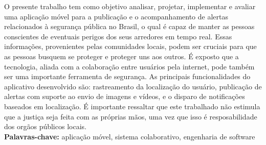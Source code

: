 \documentclass[
	12pt,				%
	openright,			%
	oneside,			%
	a4paper,			%
	english,			%
	french,				%
	spanish,			%
	brazil,				%
	]{lib/abntex2}
\begin{document}




\setlength{\absparsep}{18pt} %

\begin{resumo}
	O presente trabalho tem como objetivo analisar, projetar, implementar e avaliar uma aplicação móvel para a publicação e o acompanhamento de alertas relacionados à segurança pública no Brasil, o qual é capaz de manter as pessoas conscientes de eventuais perigos dos seus arredores em tempo real. Essas informações, provenientes pelas comunidades locais, podem ser cruciais para que as pessoas busquem se proteger e proteger uns aos outros. É exposto que a tecnologia, aliada com a colaboração entre usuários pela internet, pode também ser uma importante ferramenta de segurança. As principais funcionalidades do aplicativo desenvolvido são: rastreamento da localização do usuário, publicação de alertas com suporte ao envio de imagens e vídeos, e o disparo de notificações baseados em localização. É importante ressaltar que este trabalhado não estimula que a justiça seja feita com as próprias mãos, uma vez que isso é resposabilidade dos orgãos públicos locais.
	\\
	\textbf{Palavras-chave:} aplicação móvel, sistema colaborativo, engenharia de software
\end{resumo}
\end{document}
